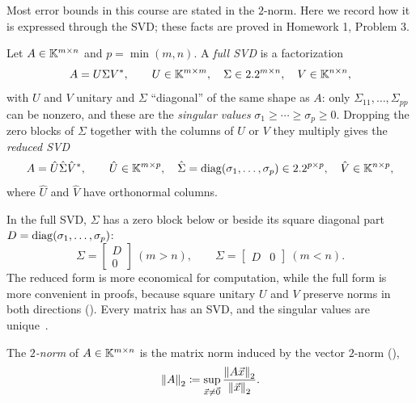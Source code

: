 Most error bounds in this course are stated in the $2$-norm. Here we record how it is expressed through the SVD; these facts are proved in Homework 1, Problem 3.

\begin{definition}
  \label{def:svd}
  Let $A \in \mathbb{K}^{m \times n}$ and $p = \min(m, n)$. A \emph{full SVD} is a factorization
  \begin{equation}
    A = U\Sigma V^\ast, \qquad U \in \mathbb{K}^{m \times m}, \quad \Sigma \in 2.2^{m \times n}, \quad V \in \mathbb{K}^{n \times n},
  \end{equation}
  with $U$ and $V$ unitary and $\Sigma$ ``diagonal'' of the same shape as $A$: only $\Sigma_{11}, \dots, \Sigma_{pp}$ can be nonzero, and these are the \emph{singular values} $\sigma_1 \ge \cdots \ge \sigma_p \ge 0$. Dropping the zero blocks of $\Sigma$ together with the columns of $U$ or $V$ they multiply gives the \emph{reduced SVD}
  \begin{equation}
    A = \hat{U}\hat{\Sigma}\hat{V}^\ast, \qquad \hat{U} \in \mathbb{K}^{m \times p}, \quad \hat{\Sigma} = \operatorname{diag}(\sigma_1, \dots, \sigma_p) \in 2.2^{p \times p}, \quad \hat{V} \in \mathbb{K}^{n \times p},
  \end{equation}
  where $\hat{U}$ and $\hat{V}$ have orthonormal columns.
\end{definition}

In the full SVD, $\Sigma$ has a zero block below or beside its square diagonal part $D = \operatorname{diag}(\sigma_1, \dots, \sigma_p)$:
\begin{equation}
  \Sigma = \begin{bmatrix} D \\ 0 \end{bmatrix} \ (m > n), \qquad
  \Sigma = \begin{bmatrix} D & 0 \end{bmatrix} \ (m < n).
\end{equation}
The reduced form is more economical for computation, while the full form is more convenient in proofs, because square unitary $U$ and $V$ preserve norms in both directions (). Every matrix has an SVD, and the singular values are unique~\cite[Theorem 4.1]{TB}.

\begin{definition}
  The \emph{$2$-norm} of $A \in \mathbb{K}^{m \times n}$ is the matrix norm induced by the vector $2$-norm (),
  \begin{equation}
    \left\lVert A \right\rVert_2 \coloneqq \sup_{\vec{x} \ne \vec{0}}\frac{\left\lVert A\vec{x} \right\rVert_2}{\left\lVert \vec{x} \right\rVert_2}.
  \end{equation}
\end{definition}

